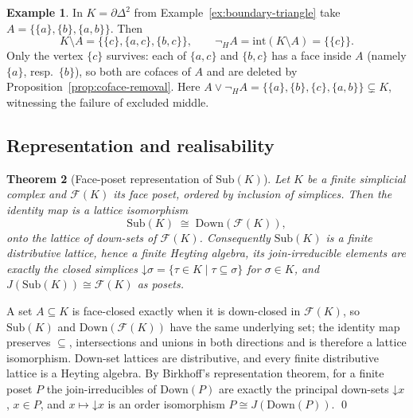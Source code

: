 \documentclass[final,12pt]{elsarticle}
\theoremstyle{plain}
\newtheorem{thm}{Theorem}[section]
\theoremstyle{definition}
\newtheorem{exa}[thm]{Example}
\begin{document}
\begin{exa}
\label{ex:heyting-negation}
In \(K = \partial\Delta^2\) from Example~\ref{ex:boundary-triangle} take
\(A = \bigl\{\{a\},\{b\},\{a,b\}\bigr\}\). Then
\[
K \setminus A = \bigl\{\{c\},\{a,c\},\{b,c\}\bigr\},
\qquad
\neg_H A = \mathrm{int}(K \setminus A) = \bigl\{\{c\}\bigr\}.
\]
Only the vertex \(\{c\}\) survives: each of \(\{a,c\}\) and \(\{b,c\}\) has a
face inside \(A\) (namely \(\{a\}\), resp.\ \(\{b\}\)), so both are cofaces of
\(A\) and are deleted by Proposition~\ref{prop:coface-removal}. Here
\(A \vee \neg_H A = \bigl\{\{a\},\{b\},\{c\},\{a,b\}\bigr\} \subsetneq K\),
witnessing the failure of excluded middle.
\end{exa}

\subsection{Representation and realisability}
\label{subsec:representation}

\begin{thm}[Face-poset representation of \texorpdfstring{$\mathrm{Sub}(K)$}{Sub(K)}]
\label{thm:subk-representation}
Let \(K\) be a finite simplicial complex and \(\mathcal F(K)\) its face poset,
ordered by inclusion of simplices. Then the identity map is a lattice
isomorphism
\[
  \mathrm{Sub}(K) \;\cong\; \mathrm{Down}(\mathcal F(K)),
\]
onto the lattice of down-sets of \(\mathcal F(K)\). Consequently
\(\mathrm{Sub}(K)\) is a finite distributive lattice, hence a finite Heyting
algebra, its join-irreducible elements are exactly the closed simplices
\(\mathord{\downarrow}\sigma = \{\tau \in K \mid \tau \subseteq \sigma\}\) for
\(\sigma \in K\), and \(J(\mathrm{Sub}(K)) \cong \mathcal F(K)\) as posets.
\end{thm}

\proof
A set \(A \subseteq K\) is face-closed exactly when it is down-closed in
\(\mathcal F(K)\), so \(\mathrm{Sub}(K)\) and \(\mathrm{Down}(\mathcal F(K))\)
have the same underlying set; the identity map preserves \(\subseteq\),
intersections and unions in both directions and is therefore a lattice
isomorphism. Down-set lattices are distributive, and every finite distributive
lattice is a Heyting algebra. By Birkhoff's representation theorem, for a finite
poset \(P\) the join-irreducibles of \(\mathrm{Down}(P)\) are exactly the
principal down-sets \(\mathord{\downarrow}x\), \(x \in P\), and
\(x \mapsto \mathord{\downarrow}x\) is an order isomorphism
\(P \cong J(\mathrm{Down}(P))\).
\qed
\end{document}
